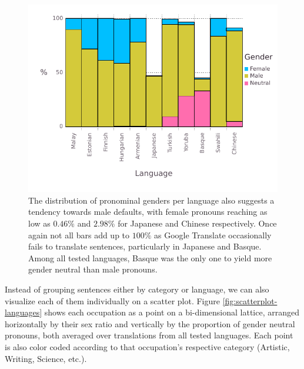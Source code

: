 \documentclass{article}
\begin{document}
\begin{figure}[H]
	\centering
	\includegraphics[width=\linewidth]{pictures/gender-by-language}
	\caption{The distribution of pronominal genders per language also suggests a tendency towards male defaults, with female pronouns reaching as low as $0.46\%$ and $2.98\%$ for Japanese and Chinese respectively. Once again not all bars add up to $100\%$ as Google Translate occasionally fails to translate sentences, particularly in Japanese and Basque. Among all tested languages, Basque was the only one to yield more gender neutral than male pronouns.}
	\label{fig:gender-by-language}
\end{figure}

Instead of grouping sentences either by category or language, we can also visualize each of them individually on a scatter plot. Figure \ref{fig:scatterplot-languages} shows each occupation as a point on a bi-dimensional lattice, arranged horizontally by their sex ratio and vertically by the proportion of gender neutral pronouns, both averaged over translations from all tested languages. Each point is also color coded according to that occupation's respective category (Artistic, Writing, Science, etc.).
\end{document}
